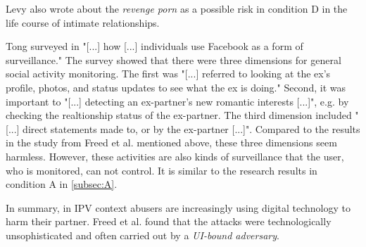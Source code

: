 Levy also wrote about the \textit{revenge porn} as a possible risk in condition D in the life course of intimate relationships.

Tong surveyed in \cite{Tong2013Facebook} "[...] how [...] individuals use Facebook as a form of surveillance." The survey showed that there were three dimensions for general social activity monitoring. The first was "[...] referred to looking at the ex's profile, photos, and status updates to see what the ex is doing." Second, it was important to "[...] detecting an ex-partner's new romantic interests [...]", e.g. by checking the realtionship status of the ex-partner. The third dimension included "[...] direct statements made to, or by the ex-partner [...]".
Compared to the results in the study from Freed et al. \cite{freed2018stalker} mentioned above, these three dimensions seem harmless. However, these activities are also kinds of surveillance that the user, who is monitored, can not control. It is similar to the research results in condition A in \ref*{subsec:A}.

In summary, in \acs{IPV} context abusers are increasingly using digital technology to harm their partner. Freed et al. \cite{freed2018stalker} found that the attacks were technologically unsophisticated and often carried out by a \textit{UI-bound adversary}.









